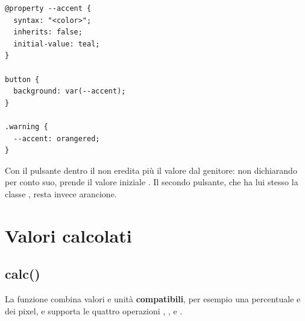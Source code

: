 \begin{affianco}[0.5][c]
\begin{lstlisting}[style=css, name=property.css]
@property --accent {
  syntax: "<color>";
  inherits: false;
  initial-value: teal;
}

button {
  background: var(--accent);
}

.warning {
  --accent: orangered;
}
\end{lstlisting}
\risultato
\begin{browser}
  \enspace
  \par\vspace{4pt}
\end{browser}
\end{affianco}

Con  il pulsante dentro il  non eredita più il
valore  dal genitore: non dichiarando  per
conto suo, prende il valore iniziale . Il secondo pulsante, che ha
lui stesso la classe , resta invece arancione.

\section{Valori calcolati}

\subsection{calc()}

La funzione  combina valori e unità \textbf{compatibili}, per
esempio una percentuale e dei pixel, e supporta le quattro operazioni
\code{+}, \code{-}, \code{*} e \code{/}.

